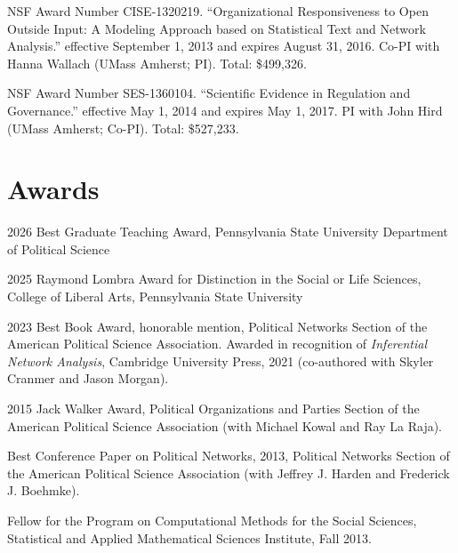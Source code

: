 \documentclass[overlapped,line]{res}
\begin{document}
\begin{resume}
\begin{etaremune}
 \item NSF Award Number CISE-1320219. ``Organizational Responsiveness to Open Outside Input: A Modeling Approach based on Statistical Text and Network Analysis.'' effective September 1, 2013 and expires August 31, 2016.  Co-PI with Hanna Wallach (UMass Amherst; PI). Total: \$499,326.
  \item NSF Award Number SES-1360104. ``Scientific Evidence in Regulation and Governance.'' effective May 1, 2014 and expires May 1, 2017.  PI with John Hird (UMass Amherst; Co-PI). Total: \$527,233.
\end{etaremune}

\section{\bf Awards}
\begin{etaremune}
\item 2026 Best Graduate Teaching Award, Pennsylvania State University Department of Political Science
\item 2025 Raymond Lombra Award for Distinction in the Social or Life Sciences, College of Liberal Arts, Pennsylvania State University
\item 2023 Best Book Award, honorable mention, Political Networks Section of the American Political Science Association. Awarded in recognition of {\em Inferential Network Analysis}, Cambridge University Press, 2021 (co-authored with Skyler Cranmer and Jason Morgan). 
\item 2015 Jack Walker Award, Political Organizations and Parties Section of the American Political Science Association (with Michael Kowal and Ray La Raja).
\item Best Conference Paper on Political Networks, 2013, Political Networks Section of the American Political Science Association (with Jeffrey J. Harden and Frederick J. Boehmke).
\item Fellow for the Program on Computational Methods for the Social Sciences, Statistical and Applied Mathematical Sciences Institute, Fall 2013.
\end{etaremune}


\end{resume}
\end{document}

